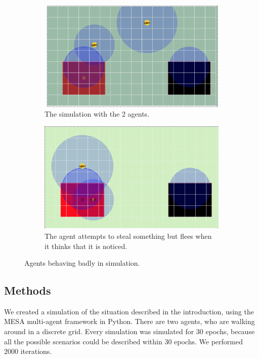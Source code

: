 \begin{figure}[htbp]
\begin{subfigure}{.5\textwidth}
\includegraphics[width=\linewidth]{images/sim1.png}
\caption{The simulation with the 2 agents.}
\end{subfigure}
\begin{subfigure}{.5\textwidth}
\includegraphics[width=\linewidth]{images/stealing.png}
\caption{The agent attempts to steal something but flees when it thinks that it is noticed.}
\end{subfigure}
\caption{Agents behaving badly in simulation.}
\label{env}
\end{figure}

\subsection{Methods}

We created a simulation of the situation described in the introduction, using the MESA multi-agent framework in Python. There are two agents, who are walking around in a discrete grid. Every simulation was simulated for 30 epochs, because all the possible scenarios could be described within 30 epochs. We performed 2000 iterations. 

